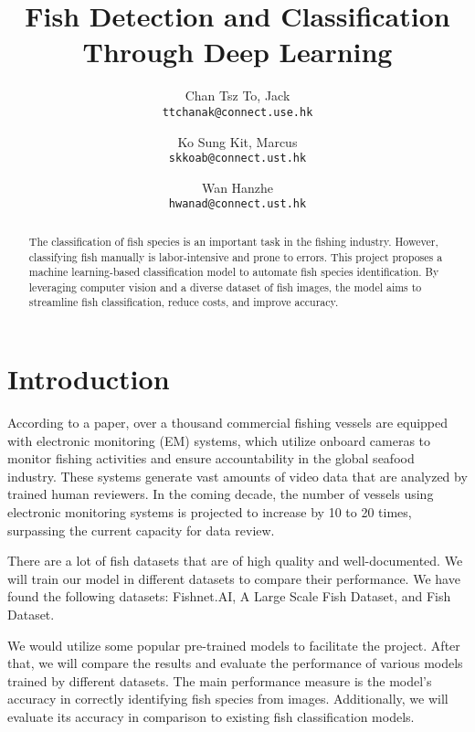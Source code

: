 \documentclass[10pt,twocolumn,letterpaper]{article}
\begin{document}
\title{Fish Detection and Classification Through Deep Learning}

\author{Chan Tsz To, Jack\\
{\tt\small ttchanak@connect.use.hk}
\and
Ko Sung Kit, Marcus\\
{\tt\small skkoab@connect.ust.hk}
\and
Wan Hanzhe\\
{\tt\small hwanad@connect.ust.hk}
}
\maketitle

\begin{abstract}
The classification of fish species is an important task in the fishing industry. However, classifying fish manually is labor-intensive and prone to errors. This project proposes a machine learning-based classification model to automate fish species identification. By leveraging computer vision and a diverse dataset of fish images, the model aims to streamline fish classification, reduce costs, and improve accuracy.
\end{abstract}

\section{Introduction}
According to a paper\cite{kay2021fishnetopenimagesdatabase}, over a thousand commercial fishing vessels are equipped with electronic monitoring (EM) systems, which utilize onboard cameras to monitor fishing activities and ensure accountability in the global seafood industry. These systems generate vast amounts of video data that are analyzed by trained human reviewers. In the coming decade, the number of vessels using electronic monitoring systems is projected to increase by 10 to 20 times, surpassing the current capacity for data review.

There are a lot of fish datasets that are of high quality and well-documented. We will train our model in different datasets to compare their performance. We have found the following datasets: Fishnet.AI, A Large Scale Fish Dataset, and Fish Dataset.

We would utilize some popular pre-trained models to facilitate the project. After that, we will compare the results and evaluate the performance of various models trained by different datasets. The main performance measure is the model's accuracy in correctly identifying fish species from images. Additionally, we will evaluate its accuracy in comparison to existing fish classification models.
{\small


}
\end{document}
